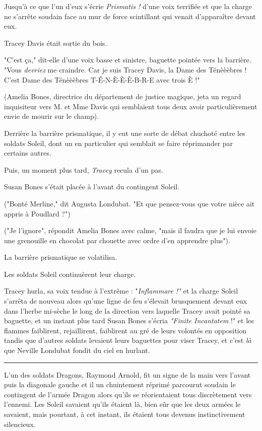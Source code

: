 Jusqu'à ce que l'un d'eux s'écrie \emph{Prismatis !}  d'une voix terrifiée et que la charge ne s'arrête soudain face au mur de force scintillant qui venait d'apparaître devant eux.

Tracey Davis était sortie du bois.

"C'est ça," dit-elle d'une voix basse et sinistre, baguette pointée vers la barrière. "Vous \emph{devriez}  me craindre. Car je suis Tracey Davis, la Dame des Ténèèèbres ! C'est Dame des Ténèèèbres T-É-N-È-È-È-B-R-E avec trois È !"

(Amelia Bones, directrice du département de justice magique, jeta un regard inquisiteur vers M. et Mme Davis qui semblaient tous deux avoir particulièrement envie de mourir sur le champ).

Derrière la barrière prismatique, il y eut une sorte de débat chuchoté entre les soldats Soleil, dont un en particulier qui semblait se faire réprimander par certains autres.

Puis, un moment plus tard, \emph{Tracey}  recula d'un pas.

Susan Bones s'était placée à l'avant du contingent Soleil.

("Bonté Merline," dit Augusta Londubat. "Et que pensez-vous que votre nièce ait appris à Poudlard ?")

("Je l'ignore", répondit Amelia Bones avec calme, "mais il faudra que je lui envoie une grenouille en chocolat par chouette avec ordre d'en apprendre plus").

La barrière prismatique se volatilisa.

Les soldats Soleil continuèrent leur charge.

Tracey hurla, sa voix tendue à l'extrême : "\emph{Inflammare !"}  et la charge Soleil s'arrêta de nouveau alors qu'une ligne de feu s'élevait brusquement devant eux dans l'herbe mi-sèche le long de la direction vers laquelle Tracey avait pointé sa baguette, et un instant plus tard Susan Bones s'écria \emph{"Finite Incantatem } !" et les flammes faiblirent, rejaillirent, faiblirent au gré de leurs volontés en opposition tandis que d'autres soldats levaient leurs baguettes pour viser Tracey, et c'est \emph{là } que Neville Londubat fondit du ciel en hurlant.
\par\noindent\rule{\textwidth}{0.4pt}
L'un des soldats Dragons, Raymond Arnold, fit un signe de la main vers l'avant puis la diagonale gauche et il un chuintement réprimé parcourut soudain le contingent de l'armée Dragon alors qu'ils se réorientaient tous discrètement vers l'ennemi. Les Soleil savaient qu'ils étaient là, bien sûr que les deux armées le savaient, mais pourtant, à cet instant, ils étaient tous devenus instinctivement silencieux.

